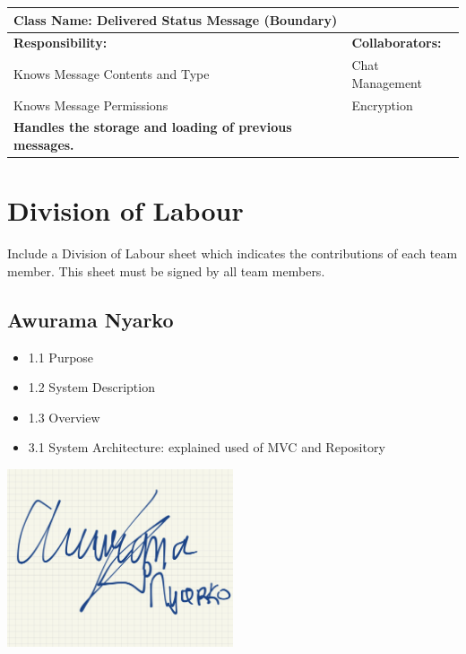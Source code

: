 \documentclass[]{article}
\begin{document}
\begin{itemize}
\begin{table}[ht]
\begin{tabular}{|p{7cm}|p{7cm}|}
		\end{tabular}
	\end{table}


	\begin{table}[ht]
		\centering
		\begin{tabular}{|p{7cm}|p{7cm}|}
		\hline 
		 \multicolumn{2}{|l|}{\textbf{Class Name: Delivered Status Message (Boundary)
}} \\
		\hline
		\textbf{Responsibility:} & \textbf{Collaborators:} \\
		\hline
            Knows Message Contents and Type & Chat Management\\
            Knows Message Permissions & Encryption\\
            \vspace{0.1in}
            \textbf{Handles the storage and loading of previous messages.}

		\vspace{1in} & \\
		\hline
  
		\end{tabular}
	\end{table}
\end{itemize}



\clearpage

\clearpage

\appendix
\section{Division of Labour}
\label{sec:division_of_labour}
Include a Division of Labour sheet which indicates the contributions of each team member. This sheet must be signed by all team members.
\subsection{Awurama Nyarko}
\label{subsec:awurama_nyarko}
\begin{itemize}
	\item 1.1 Purpose
	\item 1.2 System Description
	\item 1.3 Overview
	\item 3.1 System Architecture: explained used of MVC and Repository
\end{itemize}
\includegraphics[width=0.5\textwidth]{awurama.jpg}
\end{document}
